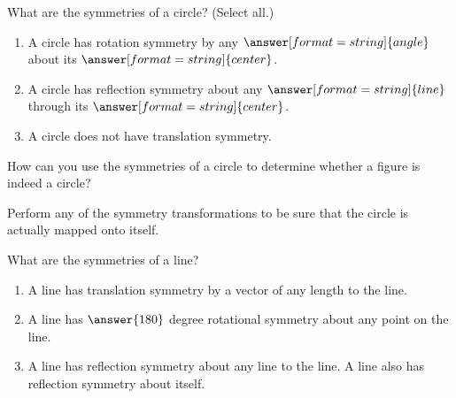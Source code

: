 \documentclass[nooutcomes]{ximera}
\begin{document}
\begin{question}
What are the symmetries of a circle? (Select all.)
\begin{selectAll}
\end{selectAll}
\begin{question}
\begin{enumerate}
\item A circle has rotation symmetry by any $\answer[format=string]{angle}$ 
about its $\answer[format=string]{center}$.  
\item A circle has reflection symmetry 
about any $\answer[format=string]{line}$ through its $\answer[format=string]{center}$.  
\item A circle does 
not have translation symmetry.  
\end{enumerate}
\end{question}
\end{question}

\begin{question}
How can you use the symmetries of a circle to determine whether a figure is indeed a circle?  
\begin{freeResponse}
\end{freeResponse}
\begin{hint}
Perform any of the symmetry transformations to be sure that the circle is actually mapped onto itself.  
\end{hint}
\end{question}

\begin{question}
What are the symmetries of a line?  
\begin{selectAll}
\end{selectAll}
\begin{question}
\begin{enumerate}
\item A line has translation symmetry by a vector of any length  to the line.   
\item A line has $\answer{180}$ degree rotational symmetry about any point on the line.  
\item A line has reflection symmetry about any line  to the line.  A line also has reflection symmetry about itself.  
\end{enumerate}
\end{question}
\end{question}
\end{document}
